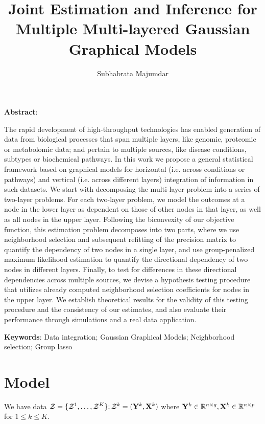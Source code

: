 \documentclass[fleqn,11pt]{article}
\numberwithin{equation}{section}
\begin{document}
\newtheorem{Theorem}{Theorem}[section]
\newtheorem{Lemma}[Theorem]{Lemma}
\newtheorem{Corollary}[Theorem]{Corollary}
\newtheorem{Proposition}[Theorem]{Proposition}
\newtheorem{Conjecture}[Theorem]{Conjecture}
\theoremstyle{definition} \newtheorem{Definition}[Theorem]{Definition}

\title{Joint Estimation and Inference for Multiple Multi-layered Gaussian Graphical Models}
\date{}
\author{Subhabrata Majumdar}
\maketitle

\noindent\textbf{Abstract}: 
\vspace{.5cm}

The rapid development of high-throughput technologies has enabled generation of data from biological processes that span multiple layers, like genomic, proteomic or metabolomic data; and pertain to multiple sources, like disease conditions, subtypes or biochemical pathways. In this work we propose a general statistical framework based on graphical models for horizontal (i.e. across conditions or pathways) and vertical (i.e. across different layers) integration of information in such datasets. We start with decomposing the multi-layer problem into a series of two-layer problems. For each two-layer problem, we model the outcomes at a node in the lower layer as dependent on those of other nodes in that layer, as well as all nodes in the upper layer. Following the biconvexity of our objective function, this estimation problem decomposes into two parts, where we use neighborhood selection and subsequent refitting of the precision matrix to quantify the dependency of two nodes in a single layer, and use group-penalized maximum likelihood estimation to quantify the directional dependency of two nodes in different layers. Finally, to test for differences in these directional dependencies across multiple sources, we devise a hypothesis testing procedure that utilizes already computed neighborhood selection coefficients for nodes in the upper layer. We establish theoretical results for the validity of this testing procedure and the consistency of our estimates, and also evaluate their performance through simulations and a real data application.

\noindent\textbf{Keywords}: Data integration; Gaussian Graphical Models; Neighborhood selection; Group lasso

\newpage

\section{Model}
We have data ${\cal{Z}} = \{ {\cal{Z}}^1, \ldots, {\cal{Z}}^K \}; {\cal{Z}}^k = ({\mathbf{Y}}^k, {\mathbf{X}}^k)$ where ${\mathbf{Y}}^k \in {\mathbb{R}}^{n \times q}, {\mathbf{X}}^k \in {\mathbb{R}}^{n \times p}$ for $1 \leq k \leq K$.
\end{document}
